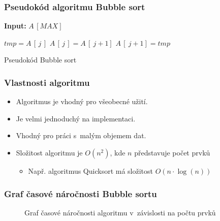 \documentclass{beamer}
\newcommand\Omicron{O}
\begin{document}
\begin{frame}\frametitle{Pseudokód algoritmu Bubble sort}
    \begin{algorithm}[H]
    \hspace*{\algorithmicindent} \textbf{Input:} $A\,[MAX]$
    \begin{algorithmic}[1]
                    \STATE $tmp = A\,[\,j\,]$
                    \STATE $A\,[\,j\,] = A\,[\:j+1]$
                    \STATE $A\,[\:j+1] = tmp$
                \ENDIF
            \ENDFOR
        \ENDFOR
    \end{algorithmic}
    \caption{Pseudokód Bubble sort}
    \end{algorithm}
\end{frame}

\begin{frame}\frametitle{Vlastnosti algoritmu}
    \begin{itemize}
        \item Algoritmus je vhodný pro všeobecné užití.
        \item Je velmi jednoduchý na implementaci.
        \item Vhodný pro práci s~malým objemem dat.
        \item Složitost algoritmu je $\Omicron{(n^2)}$, kde $n$ představuje počet prvků
        \begin{itemize}
            \item Např. algoritmus Quicksort má složitost $\Omicron{(n \cdot \log(n))}$
        \end{itemize}
    \end{itemize}
\end{frame}

\begin{frame}\frametitle{Graf časové náročnosti Bubble sortu}
        \begin{figure}[h]
       \caption{Graf časové náročnosti algoritmu v~závislosti na počtu prvků}
        \label{obr2}
    \end{figure}
\end{frame}
\end{document}
